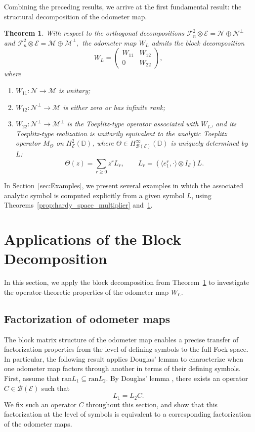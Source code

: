 \documentclass[12pt]{amsart}
\newtheorem{theorem}{Theorem}[section]
\theoremstyle{definition}
\theoremstyle{remark}
\def \D{\mathbb{D}}
\newcommand{\clb}{\mathcal{B}}
\newcommand{\cle}{\mathcal{E}}
\newcommand{\clm}{\mathcal{M}}
\newcommand{\cln}{\mathcal{N}}
\newcommand{\clf}{\mathcal{F}}
\newcommand{\ran}{\mathrm{ran}}
\numberwithin{equation}{section}
\begin{document}
Combining the preceding results, we arrive at the first fundamental result: the structural decomposition of the odometer map.

\begin{theorem}\label{thm:WL_structural_sum}
With respect to the orthogonal decompositions $\clf_n^2\otimes \cle=\cln\oplus \cln^\perp$ and $\clf_n^2\otimes \cle=\clm\oplus \clm^\perp,$
the odometer map $W_L$ admits the block decomposition
\[
W_L=
\begin{pmatrix}
W_{11} & W_{12}\\
0 & W_{22}
\end{pmatrix},
\]
where
\begin{enumerate}
    \item $W_{11}:\cln\to \clm$ is unitary;

        \item $W_{12}:\cln^\perp\to \clm$ is either zero or has infinite rank;

    \item \(W_{22}:\cln^\perp\to \clm^\perp\) is the Toeplitz-type operator
associated with \(W_L\), and its Toeplitz-type realization is unitarily
equivalent to the analytic Toeplitz operator \(M_\Theta\) on
\(H^2_{\cle}(\D)\), 
where \(\Theta\in H^\infty_{\clb(\cle)}(\D)\) is uniquely determined by \(L\):
\[
\Theta(z)=\sum_{r\geq 0}z^rL_r,
\qquad
L_r=(\langle e_1^r,\cdot\rangle\otimes I_\cle)L.
\]
\end{enumerate}
\end{theorem}
In Section~\ref{sec:Examples}, we present several examples in which the associated analytic symbol is computed explicitly from a given symbol \(L\), using Theorems~\ref{prop:hardy_space_multiplier} and~\ref{thm:WL_structural_sum}.

\section{Applications of the Block Decomposition} \label{sec:appl_block_decomp}
In this section, we apply the block decomposition from
Theorem~\ref{thm:WL_structural_sum} to investigate the operator-theoretic
properties of the odometer map \(W_L\).
\subsection{Factorization of odometer maps}\label{sec:Douglas-factorization-odometer-maps}
The block matrix structure of the odometer map enables a precise transfer of factorization properties from the level of defining symbols to the full Fock space. In particular, the following result applies Douglas’ lemma \cite{Douglas1966} to characterize when one odometer map factors through another in terms of their defining symbols. 
First, assume that $\ran L_1\subseteq \ran L_2$. By Douglas' lemma
\cite{Douglas1966}, there exists an operator $C\in \clb(\cle)$ such that
$$L_1=L_2C.$$
We fix such an operator \(C\) throughout this section, and 
show that this factorization at the level of symbols is
equivalent to a corresponding factorization of the odometer maps.
\end{document}
